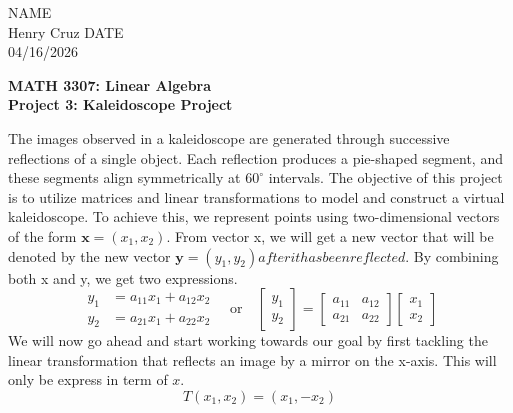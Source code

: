 
\begin{flushright}
    NAME\\Henry Cruz
    DATE\\04/16/2026
\end{flushright}

\begin{center}
    \textbf{MATH 3307: Linear Algebra\\
    Project 3: Kaleidoscope Project\\}
\end{center}
The images observed in a kaleidoscope are generated through successive reflections of a single object. Each reflection produces a pie-shaped segment, and these segments align symmetrically at $60^\circ$ intervals. The objective of this project is to utilize matrices and linear transformations to model and construct a virtual kaleidoscope. To achieve this, we represent points using two-dimensional vectors of the form $\mathbf{x} = (x_1, x_2)$. From vector x, we will get a new vector that will be denoted by the new vector $\mathbf{y} = (y_1,y_2) after it has been reflected$. By combining both x and y, we get two expressions. 
\[
\begin{aligned}
y_1 &= a_{11}x_1 + a_{12}x_2 \\
y_2 &= a_{21}x_1 + a_{22}x_2
\end{aligned}
\quad \text{or} \quad
\begin{bmatrix}
y_1 \\
y_2
\end{bmatrix}
=
\begin{bmatrix}
a_{11} & a_{12} \\
a_{21} & a_{22}
\end{bmatrix}
\begin{bmatrix}
x_1 \\
x_2
\end{bmatrix}
\]
We will now go ahead and start working towards our goal by first tackling the linear transformation that reflects an image by a mirror on the x-axis. This will only be express in term of $x$. \[
T(x_1, x_2) = (x_1, -x_2)
\]

